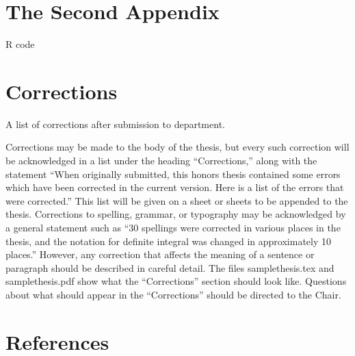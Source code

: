 \documentclass[12pt, twoside]{amherstthesis}
\begin{document}
\hypertarget{the-second-appendix}{%
\chapter{The Second Appendix}\label{the-second-appendix}}

R code

\hypertarget{corrections}{%
\chapter*{Corrections}\label{corrections}}

A list of corrections after submission to department.

Corrections may be made to the body of the thesis, but every such correction will be acknowledged in a list under the heading ``Corrections,'' along with the statement ``When originally submitted, this honors thesis contained some errors which have been corrected in the current version. Here is a list of the errors that were corrected.'' This list will be given on a sheet or sheets to be appended to the thesis. Corrections to spelling, grammar, or typography may be acknowledged by a general statement such as ``30 spellings were corrected in various places in the thesis, and the notation for definite integral was changed in approximately 10 places.'' However, any correction that affects the meaning of a sentence or paragraph should be described in careful detail. The files samplethesis.tex and samplethesis.pdf show what the ``Corrections'' section should look like. Questions about what should appear in the ``Corrections'' should be directed to the Chair.

\backmatter

\hypertarget{references}{%
\chapter*{References}\label{references}}

\noindent

\setlength{\parindent}{-0.20in}
\setlength{\leftskip}{0.20in}
\setlength{\parskip}{8pt}
\end{document}
